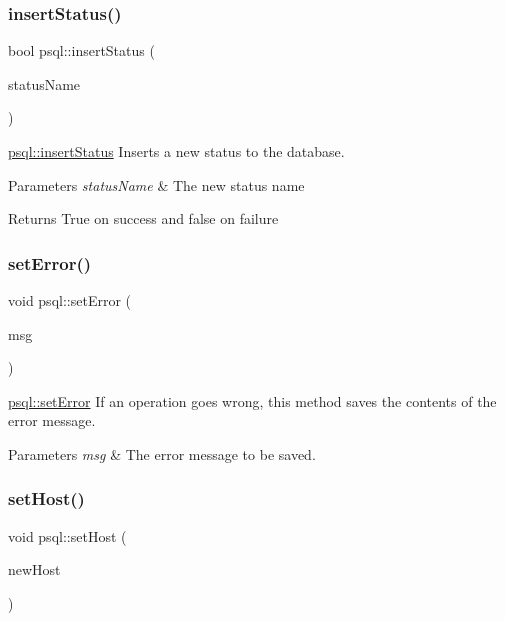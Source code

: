 \subsubsection{\texorpdfstring{insert\+Status()}{insertStatus()}}
{\footnotesize\ttfamily bool psql\+::insert\+Status (\begin{DoxyParamCaption}\item[{Q\+String}]{status\+Name }\end{DoxyParamCaption})}



\mbox{\hyperlink{classpsql_a601ee0bdc9430b1d674a857f7c94b767}{psql\+::insert\+Status}} Inserts a new status to the database. 


\begin{DoxyParams}{Parameters}
{\em status\+Name} & The new status name \\
\hline
\end{DoxyParams}
\begin{DoxyReturn}{Returns}
True on success and false on failure 
\end{DoxyReturn}
\mbox{\label{classpsql_a9a0d5ba32aabe6018a36fb0bc185445b}} 
\subsubsection{\texorpdfstring{set\+Error()}{setError()}}
{\footnotesize\ttfamily void psql\+::set\+Error (\begin{DoxyParamCaption}\item[{Q\+String}]{msg }\end{DoxyParamCaption})}



\mbox{\hyperlink{classpsql_a9a0d5ba32aabe6018a36fb0bc185445b}{psql\+::set\+Error}} If an operation goes wrong, this method saves the contents of the error message. 


\begin{DoxyParams}{Parameters}
{\em msg} & The error message to be saved. \\
\hline
\end{DoxyParams}
\mbox{\label{classpsql_a96b3b9483f1a642c026d4b5cf505eb75}} 
\subsubsection{\texorpdfstring{set\+Host()}{setHost()}}
{\footnotesize\ttfamily void psql\+::set\+Host (\begin{DoxyParamCaption}\item[{Q\+String}]{new\+Host }\end{DoxyParamCaption})}




